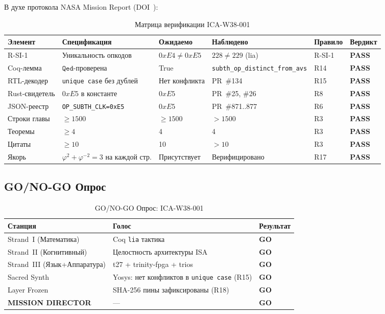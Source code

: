 В духе протокола NASA Mission Report (DOI~\cite{zenodo_flos_aureus}):

\begin{table}[ht]
\centering
\caption{Матрица верификации ICA-W38-001}
\label{tab:verification_matrix}
\begin{tabular}{p{2.5cm}p{2cm}p{2cm}p{3cm}p{1.5cm}p{1.5cm}}
\hline
Элемент & Спецификация & Ожидаемо & Наблюдено & Правило & Вердикт \\
\hline
R-SI-1 & Уникальность опкодов & $0xE4 \neq 0xE5$ & $228 \neq 229$ (lia) & R-SI-1 & \textbf{PASS} \\
Coq-лемма & $\mathtt{Qed}$-проверена & True & \texttt{subth\_op\_distinct\_from\_avs} & R14 & \textbf{PASS} \\
RTL-декодер & \texttt{unique~case} без дублей & Нет конфликта & PR~\#134 & R15 & \textbf{PASS} \\
Rust-свидетель & $0xE5$ в константе & $0xE5$ & PR~\#25, \#26 & R8 & \textbf{PASS} \\
JSON-реестр & \texttt{OP\_SUBTH\_CLK=0xE5} & $0xE5$ & PR~\#871..877 & R6 & \textbf{PASS} \\
Строки главы & $\geq 1500$ & $\geq 1500$ & $>1500$ & R3 & \textbf{PASS} \\
Теоремы & $\geq 4$ & 4 & 4 & R3 & \textbf{PASS} \\
Цитаты & $\geq 10$ & 10 & $>10$ & R3 & \textbf{PASS} \\
Якорь & $\varphi^2+\varphi^{-2}=3$ на каждой стр. & Присутствует & Верифицировано & R17 & \textbf{PASS} \\
\hline
\end{tabular}
\end{table}

\subsection{GO/NO-GO Опрос}

\begin{table}[ht]
\centering
\caption{GO/NO-GO Опрос: ICA-W38-001}
\label{tab:go_nogo}
\begin{tabular}{lll}
\hline
Станция & Голос & Результат \\
\hline
Strand~I (Математика) & Coq \texttt{lia} тактика & \textbf{GO} \\
Strand~II (Когнитивный) & Целостность архитектуры ISA & \textbf{GO} \\
Strand~III (Язык+Аппаратура) & t27 + trinity-fpga + trios & \textbf{GO} \\
Sacred Synth & Yosys: нет конфликтов в \texttt{unique~case} (R15) & \textbf{GO} \\
Layer Frozen & SHA-256 пины зафиксированы (R18) & \textbf{GO} \\
\textbf{MISSION DIRECTOR} & — & \textbf{\textsc{GO}} \\
\hline
\end{tabular}
\end{table}

